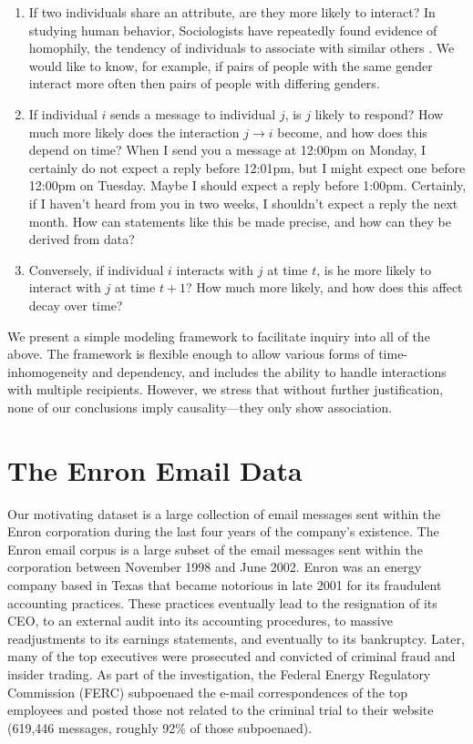 \documentclass[aoas,preprint]{imsart}
\begin{document}
\begin{enumerate}
	\item If two individuals share an attribute, are they more likely to interact?  In studying human behavior, Sociologists have repeatedly found evidence of homophily, the tendency of individuals to associate with similar others \cite{mcpherson2001birds}.  We would like to know, for example, if pairs of people with the same gender interact more often then pairs of people with differing genders.
	
	\item If individual $i$ sends a message to individual $j$, is $j$ likely to respond?  How much more likely does the interaction $j \to i$ become, and how does this depend on time?  When I send you a message at 12:00pm on Monday, I certainly do not expect a reply before 12:01pm, but I might expect one before 12:00pm on Tuesday.  Maybe I should expect a reply before 1:00pm.  Certainly, if I haven't heard from you in two weeks, I shouldn't expect a reply the next month.  How can statements like this be made precise, and how can they be derived from data?
	
	\item Conversely, if individual $i$ interacts with $j$ at time $t$, is he more likely to interact with $j$ at time $t+1$?  How much more likely, and how does this affect decay over time?
\end{enumerate}

We present a simple modeling framework to facilitate inquiry into all of the above.  The framework is flexible enough to allow various forms of time-inhomogeneity and dependency, and includes the ability to handle interactions with multiple recipients.  However, we stress that without further justification, none of our conclusions imply causality---they only show association.


\section{The Enron Email Data}

Our motivating dataset is a large collection of email messages sent within the Enron corporation during the last four years of the company's existence. The Enron email corpus is a large subset of the email messages sent within the  corporation between November 1998 and June 2002.  Enron was an energy company based in Texas that became notorious in late 2001 for its fraudulent accounting practices.  These practices eventually lead to the resignation of its CEO, to an external audit into its accounting procedures, to massive readjustments to its earnings statements, and eventually to its bankruptcy. Later, many of the top executives were prosecuted and convicted of criminal fraud and insider trading.  As part of the investigation, the Federal Energy Regulatory Commission (FERC) subpoenaed the e-mail correspondences of the top employees and posted those not related to the criminal trial to their website (619,446 messages, roughly 92\% of those subpoenaed).
\end{document}
